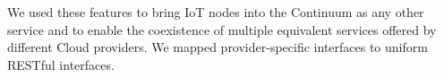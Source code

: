 We used these features to bring IoT nodes into the Continuum as any other service and to enable the coexistence of multiple equivalent services offered by different Cloud providers. We mapped provider-specific interfaces to uniform RESTful interfaces.




